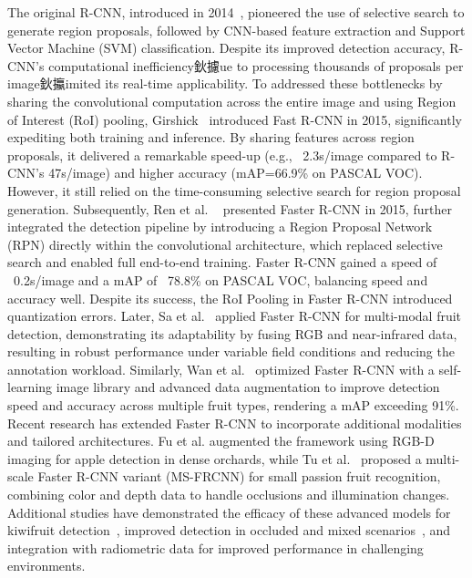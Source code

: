 \documentclass[a4paper,fleqn]{cas-dc}
\begin{document}
The original R-CNN, introduced in 2014~\cite{girshick2014rcnn}, pioneered the use of selective search to generate region proposals, followed by CNN-based feature extraction and Support Vector Machine (SVM) classification. Despite its improved detection accuracy, R-CNN's computational inefficiency鈥攄ue to processing thousands of proposals per image鈥攍imited its real-time applicability.
To addressed these bottlenecks by sharing the convolutional computation across the entire image and using Region of Interest (RoI) pooling, Girshick~\cite{girshick2015fast} introduced Fast R-CNN in 2015, significantly expediting both training and inference. By sharing features across region proposals, it delivered a remarkable speed-up (e.g., ~2.3s/image compared to R-CNN's 47s/image) and higher accuracy (mAP=66.9\% on PASCAL VOC). However, it still relied on the time-consuming selective search for region proposal generation.
Subsequently, Ren et al. ~\cite{ren2015faster} presented Faster R-CNN in 2015, further integrated the detection pipeline by introducing a Region Proposal Network (RPN) directly within the convolutional architecture, which replaced selective search and enabled full end-to-end training. Faster R-CNN gained a speed of ~0.2s/image and a mAP of ~78.8\% on PASCAL VOC, balancing speed and accuracy well. Despite its success, the RoI Pooling in Faster R-CNN introduced quantization errors. 
Later, Sa et al.~\cite{sa2016deepfruits} applied Faster R-CNN for multi-modal fruit detection, demonstrating its adaptability by fusing RGB and near-infrared data, resulting in robust performance under variable field conditions and reducing the annotation workload. Similarly, Wan et al.~\cite{wan2020faster} optimized Faster R-CNN with a self-learning image library and advanced data augmentation to improve detection speed and accuracy across multiple fruit types, rendering a mAP exceeding 91\%.
Recent research has extended Faster R-CNN to incorporate additional modalities and tailored architectures. Fu et al.\cite{fu2020faster} augmented the framework using RGB-D imaging for apple detection in dense orchards, while Tu et al.~\cite{tu2020passion} proposed a multi-scale Faster R-CNN variant (MS-FRCNN) for small passion fruit recognition, combining color and depth data to handle occlusions and illumination changes. Additional studies have demonstrated the efficacy of these advanced models for kiwifruit detection~\cite{fu2018kiwifruit}, improved detection in occluded and mixed scenarios~\cite{gene2019multi, mu2020intact}, and integration with radiometric data for improved performance in challenging environments.
\end{document}
